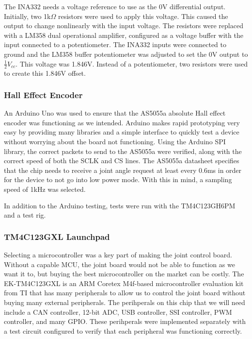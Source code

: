 \noindent The INA332 needs a voltage reference to use as the 0V differential output. Initially, two 1k$\Omega$ resistors were used to apply this voltage. This caused the output to change nonlinearly with the input voltage. The resistors were replaced with a LM358 dual operational amplifier, configured as a voltage buffer with the input connected to a potentiometer. The INA332 inputs were connected to ground and the LM358 buffer potentiometer was adjusted to set the 0V output to  $\frac{1}{2} V_{cc}$. This voltage was 1.846V. Instead of a potentiometer, two resistors were used to create this 1.846V offset.

\subsubsection{Hall Effect Encoder}
An Arduino Uno was used to ensure that the AS5055a absolute Hall effect encoder was functioning as we intended. Arduino makes rapid prototyping very easy by providing many libraries and a simple interface to quickly test a device without worrying about the board not functioning. Using the Arduino SPI library, the correct packets to send to the AS5055a were verified, along with the correct speed of both the SCLK and CS lines. The AS5055a datasheet specifies that the chip needs to receive a joint angle request at least every 0.6ms in order for the device to not go into low power mode. With this in mind, a sampling speed of 1kHz was selected.

\noindent In addition to the Arduino testing, tests were run with the TM4C123GH6PM and a test rig. %

\subsubsection{TM4C123GXL Launchpad}
Selecting a microcontroller was a key part of making the joint control board. Without a capable MCU, the joint board would not be able to function as we want it to, but buying the best microcontroller on the market can be costly. The EK-TM4C123GXL is an ARM Coretex M4f-based microcontroller evaluation kit from TI that has many peripherals to allow us to control the joint board without buying many external peripherals. The perihperals on this chip that we will need include a CAN controller, 12-bit ADC, USB controller, SSI controller, PWM controller, and many GPIO. These perihperals were implemented separately with a test circuit configured to verify that each peripheral was functioning correctly.

